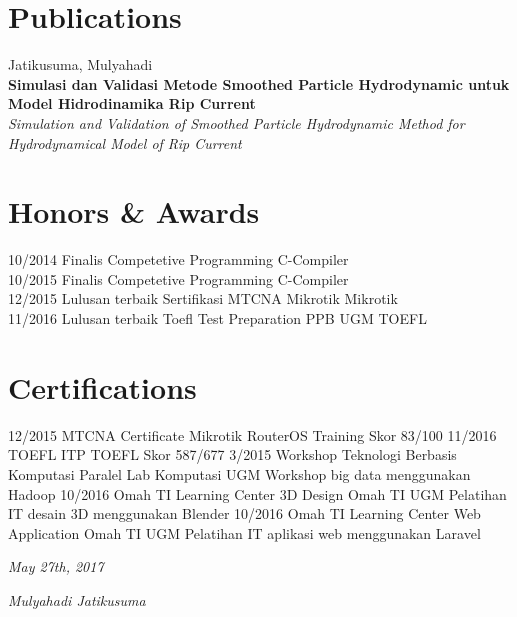 \documentclass[]{friggeri-cv}
\begin{document}
\section{Publications}
Jatikusuma, Mulyahadi\\
\textbf{Simulasi dan Validasi Metode Smoothed Particle Hydrodynamic untuk Model Hidrodinamika Rip Current}\\
\emph{Simulation and Validation of Smoothed Particle Hydrodynamic Method for Hydrodynamical Model of Rip Current}
\\

\section{Honors \& Awards}
\begin{entrylist}
  \entry
    {10/2014}
    {Finalis Competetive Programming}
    {C-Compiler}
    {\\}
  \entry
    {10/2015}
    {Finalis Competetive Programming}
    {C-Compiler}
    {\\}
  \entry
    {12/2015}
    {Lulusan terbaik Sertifikasi MTCNA Mikrotik}
    {Mikrotik}
    {\\}
  \entry
	{11/2016}
    {Lulusan terbaik Toefl Test Preparation PPB UGM}
    {TOEFL}
  {\\}
\end{entrylist}

\section{Certifications}
\begin{entrylist}
  \entry
    {12/2015}
    {MTCNA Certificate}
    {Mikrotik RouterOS Training}
    {Skor 83/100}
  \entry
    {11/2016}
    {TOEFL ITP}
    {TOEFL}
    {Skor 587/677}
  \entry
	{3/2015}
	{Workshop Teknologi Berbasis Komputasi Paralel}
	{Lab Komputasi UGM}
	{Workshop big data menggunakan Hadoop}
  \entry
    {10/2016}
    {Omah TI Learning Center 3D Design}
    {Omah TI UGM}
    {Pelatihan IT desain 3D menggunakan Blender}
  \entry
    {10/2016}
    {Omah TI Learning Center Web Application}
    {Omah TI UGM}
    {Pelatihan IT aplikasi web menggunakan Laravel}
\end{entrylist}

\begin{flushleft}
\emph{May 27th, 2017}
\end{flushleft}
\begin{flushright}
\emph{Mulyahadi Jatikusuma}
\end{flushright}
\end{document}
